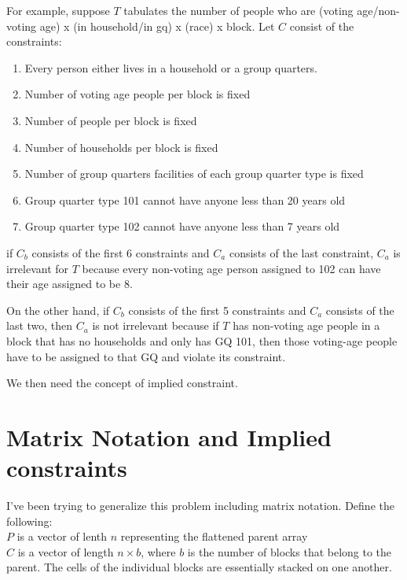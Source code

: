 \documentclass[12pt]{amsart}
\newcommand{\noi}{\noindent}
\begin{document}
For example, suppose $T$ tabulates the number of people who are (voting age/non-voting age) x (in household/in gq) x (race) x block. Let $C$ consist of the constraints:
\begin{enumerate}
\item Every person either lives in a household or a group quarters.
\item Number of voting age people per block is fixed
\item Number of people per block is fixed
\item Number of households per block is fixed
\item Number of group quarters facilities of each group quarter type is fixed
\item Group quarter type 101 cannot have anyone less than 20 years old
\item Group quarter type 102 cannot have anyone less than 7 years old
\end{enumerate} 
if $C_b$ consists of the first 6 constraints and $C_a$ consists of the last constraint, $C_a$ is irrelevant for $T$ because every non-voting age person assigned to 102 can have their age assigned to be 8.

On the other hand, if $C_b$ consists of the first 5 constraints and $C_a$ consists of the last two, then $C_a$ is not irrelevant because if $T$ has non-voting age people in a block that has no households and only has GQ 101, then those voting-age people have to be assigned to that GQ and violate its constraint.

We then need the concept of implied constraint.



\section{Matrix Notation and Implied constraints}

\noi I've been trying to generalize this problem including matrix notation. Define the following:\\

\noi $P$ is a vector of lenth $n$ representing the flattened parent array\\
$C$ is a vector of length $n \times b$, where $b$ is the number of blocks that belong to the parent. The cells of the individual blocks are essentially stacked on one another.
\end{document}
